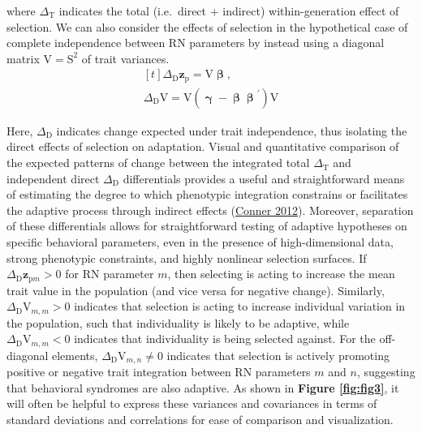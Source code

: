 \documentclass{article}
\begin{document}
where \(\Delta_{\mathrm{T}}\) indicates the total (i.e.~direct +
indirect) within-generation effect of selection. We can also consider
the effects of selection in the hypothetical case of complete
independence between RN parameters by instead using a diagonal matrix
\(\boldsymbol{\mathrm{V}}=\boldsymbol{\mathrm{S}}^2\) of trait
variances. \begin{equation} \tag{4.2}\label{eq:4.2}
\begin{gathered}[t]
\Delta_{\mathrm{D}} \boldsymbol{z}_{\boldsymbol{\mathrm{p}}} =
\boldsymbol{\mathrm{V}} \boldsymbol{\upbeta}, \\ 
\Delta_{\mathrm{D}} \boldsymbol{\mathrm{V}} = \boldsymbol{\mathrm{V}} \left( \boldsymbol{\upgamma} - \boldsymbol{ \upbeta \upbeta }^{'} \right) \boldsymbol{\mathrm{V}} \nonumber
\end{gathered}
\end{equation}

Here, \(\Delta_{\mathrm{D}}\) indicates change expected under trait
independence, thus isolating the direct effects of selection on
adaptation. Visual and quantitative comparison of the expected patterns
of change between the integrated total \(\Delta_{\mathrm{T}}\) and
independent direct \(\Delta_{\mathrm{D}}\) differentials provides a
useful and straightforward means of estimating the degree to which
phenotypic integration constrains or facilitates the adaptive process
through indirect effects (\protect\hyperlink{ref-Conner2012}{Conner
2012}). Moreover, separation of these differentials allows for
straightforward testing of adaptive hypotheses on specific behavioral
parameters, even in the presence of high-dimensional data, strong
phenotypic constraints, and highly nonlinear selection surfaces. If
\(\Delta_{\mathrm{D}} \boldsymbol{z}_{\boldsymbol{\mathrm{p}}m} > 0\)
for RN parameter \(m\), then selecting is acting to increase the mean
trait value in the population (and vice versa for negative change).
Similarly, \(\Delta_{\mathrm{D}} \boldsymbol{\mathrm{V}}_{m,m} > 0\)
indicates that selection is acting to increase individual variation in
the population, such that individuality is likely to be adaptive, while
\(\Delta_{\mathrm{D}} \boldsymbol{\mathrm{V}}_{m,m} < 0\) indicates that
individuality is being selected against. For the off-diagonal elements,
\(\Delta_{\mathrm{D}} \boldsymbol{\mathrm{V}}_{m,n} \neq 0\) indicates
that selection is actively promoting positive or negative trait
integration between RN parameters \(m\) and \(n\), suggesting that
behavioral syndromes are also adaptive. As shown in \textbf{Figure
\ref{fig:fig3}}, it will often be helpful to express these variances and
covariances in terms of standard deviations and correlations for ease of
comparison and visualization.
\end{document}
